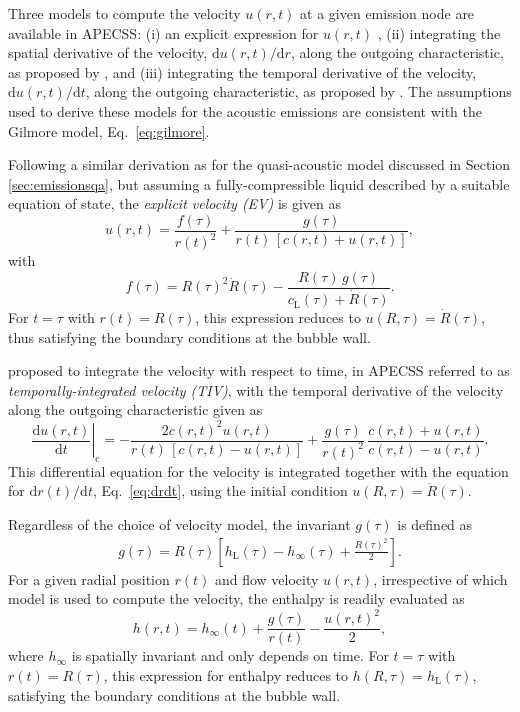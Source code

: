 Three models to compute the velocity $u(r,t)$ at a given emission node are available in APECSS: (i) an explicit expression for $u(r,t)$ \citep{Denner2023}, (ii) integrating the spatial derivative of the velocity, $\mathrm{d}u(r,t)/\mathrm{d}r$, along the outgoing characteristic, as proposed by \citet{Gilmore1952}, and (iii) integrating the temporal derivative of the velocity, $\mathrm{d}u(r,t)/\mathrm{d}t$, along the outgoing characteristic, as proposed by \citet{Hickling1963}. The assumptions used to derive these models for the acoustic emissions are consistent with the Gilmore model, Eq.~\eqref{eq:gilmore}.

Following a similar derivation as for the quasi-acoustic model discussed in Section \ref{sec:emissionsqa}, but assuming a fully-compressible liquid described by a suitable equation of state, the {\it explicit velocity (EV)} is given as
\begin{equation}
    u(r,t) = \frac{f(\tau)}{r(t)^2} + \frac{g(\tau)}{r(t) \, [c(r,t) + u(r,t)]} , \label{eq:u_rt}
\end{equation}
with 
\begin{equation}
    f(\tau) = R(\tau)^2 \dot{R}(\tau) - \frac{R(\tau) \, g(\tau)}{c_\mathrm{L}(\tau) + \dot{R}(\tau)}  . \label{eq:f_R}
\end{equation}
For $t=\tau$ with $r(t)=R(\tau)$, this expression reduces to $u(R,\tau)=\dot{R}(\tau)$, thus satisfying the boundary conditions at the bubble wall.

\citet{Hickling1963} proposed to integrate the velocity with respect to time, in APECSS referred to as {\it temporally-integrated velocity (TIV)}, with the temporal derivative of the velocity along the outgoing characteristic given as
\begin{equation}
    \left. \frac{\mathrm{d}u(r,t)}{\mathrm{d}t} \right|_\text{c} =  - \frac{2 c(r,t)^2 u(r,t)}{r(t) \, [c(r,t)-u(r,t)]} + \frac{g(\tau)}{r(t)^2} \, \frac{c(r,t)+u(r,t)}{c(r,t)-u(r,t)}. \label{eq:dudt_rt}
\end{equation}
This differential equation for the velocity is integrated together with the equation for ${\mathrm{d}r(t)/\mathrm{d}t}$, Eq.~\eqref{eq:drdt}, using the initial condition $u(R,\tau) = \dot{R}(\tau)$. 

Regardless of the choice of velocity model, the invariant $g(\tau)$ is defined as
\begin{align}
    g(\tau) = R(\tau) \left[h_\mathrm{L}(\tau) - h_\infty(\tau) + \frac{\dot{R}(\tau)^2}{2} \right]
    \label{eq:g_R} .
\end{align}
For a given radial position $r(t)$ and flow velocity $u(r,t)$, irrespective of which model is used to compute the velocity, the enthalpy is readily evaluated as
\begin{equation}
    h(r,t) = h_\infty(t) + \frac{g(\tau)}{r(t)} - \frac{u(r,t)^2}{2}, \label{eq:h_rt}
\end{equation}
where $h_\infty$ is spatially invariant and only depends on time. For $t=\tau$ with $r(t)=R(\tau)$, this expression for enthalpy reduces to $h(R,\tau)=h_\mathrm{L}(\tau)$, satisfying the boundary conditions at the bubble wall. 

